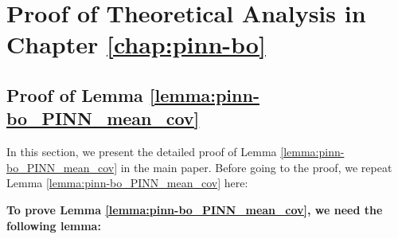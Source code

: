 \section{Proof of Theoretical Analysis in Chapter \ref{chap:pinn-bo}}
\label{section:pinn-bo_appendix}

\subsection{Proof of Lemma \ref{lemma:pinn-bo_PINN_mean_cov}}
In this section, we present the detailed proof of Lemma \ref{lemma:pinn-bo_PINN_mean_cov} in the main paper. Before going to the proof, we repeat Lemma \ref{lemma:pinn-bo_PINN_mean_cov} here:
\PinnMeanCov*

\textbf{To prove Lemma \ref{lemma:pinn-bo_PINN_mean_cov}, we need the following lemma:}

